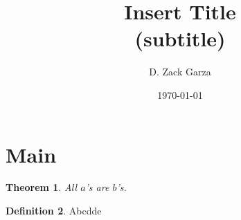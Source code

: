 \documentclass[11pt]{article}
\title{
	\textbf{Insert Title}\\ 
	{\normalsize (subtitle)}
}
\author{D. Zack Garza}
\date{\today}
\theoremstyle{plain}
\newtheorem{thm}{Theorem}[chapter] %
\theoremstyle{definition}
\newtheorem{defn}[thm]{Definition} %
\theoremstyle{plain}
\begin{document}
\maketitle

\tableofcontents

\section{Main}

\begin{thm}
All $a$'s are $b$'s. 
\end{thm}

\begin{defn}
Abcdde\cite{	hatcherAlgebraicTopologya}
\end{defn}

 

\end{document}
